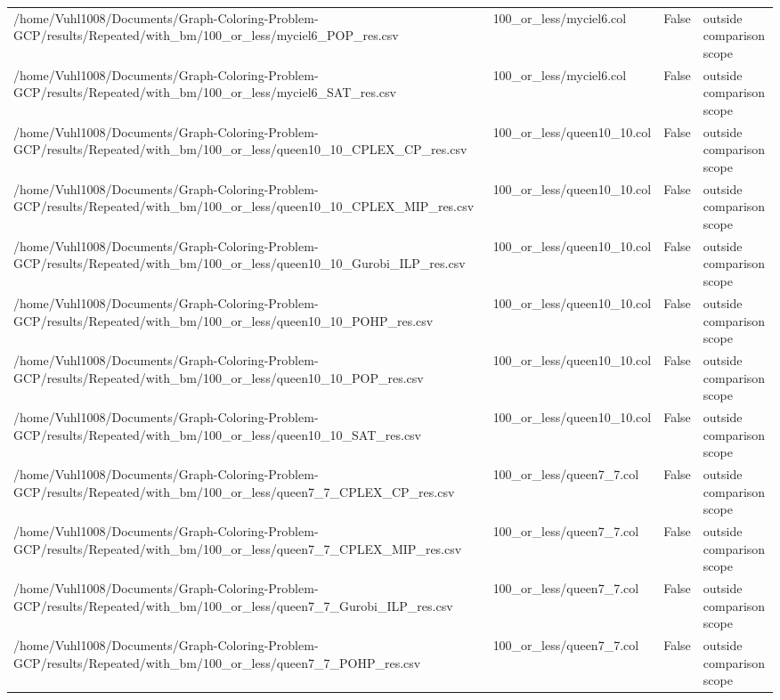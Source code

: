 \begin{table}[htbp]
\begin{tabular}{llll}
/home/Vuhl1008/Documents/Graph-Coloring-Problem-GCP/results/Repeated/with\_bm/100\_or\_less/myciel6\_POP\_res.csv & 100\_or\_less/myciel6.col & False & outside comparison scope \\
/home/Vuhl1008/Documents/Graph-Coloring-Problem-GCP/results/Repeated/with\_bm/100\_or\_less/myciel6\_SAT\_res.csv & 100\_or\_less/myciel6.col & False & outside comparison scope \\
/home/Vuhl1008/Documents/Graph-Coloring-Problem-GCP/results/Repeated/with\_bm/100\_or\_less/queen10\_10\_CPLEX\_CP\_res.csv & 100\_or\_less/queen10\_10.col & False & outside comparison scope \\
/home/Vuhl1008/Documents/Graph-Coloring-Problem-GCP/results/Repeated/with\_bm/100\_or\_less/queen10\_10\_CPLEX\_MIP\_res.csv & 100\_or\_less/queen10\_10.col & False & outside comparison scope \\
/home/Vuhl1008/Documents/Graph-Coloring-Problem-GCP/results/Repeated/with\_bm/100\_or\_less/queen10\_10\_Gurobi\_ILP\_res.csv & 100\_or\_less/queen10\_10.col & False & outside comparison scope \\
/home/Vuhl1008/Documents/Graph-Coloring-Problem-GCP/results/Repeated/with\_bm/100\_or\_less/queen10\_10\_POHP\_res.csv & 100\_or\_less/queen10\_10.col & False & outside comparison scope \\
/home/Vuhl1008/Documents/Graph-Coloring-Problem-GCP/results/Repeated/with\_bm/100\_or\_less/queen10\_10\_POP\_res.csv & 100\_or\_less/queen10\_10.col & False & outside comparison scope \\
/home/Vuhl1008/Documents/Graph-Coloring-Problem-GCP/results/Repeated/with\_bm/100\_or\_less/queen10\_10\_SAT\_res.csv & 100\_or\_less/queen10\_10.col & False & outside comparison scope \\
/home/Vuhl1008/Documents/Graph-Coloring-Problem-GCP/results/Repeated/with\_bm/100\_or\_less/queen7\_7\_CPLEX\_CP\_res.csv & 100\_or\_less/queen7\_7.col & False & outside comparison scope \\
/home/Vuhl1008/Documents/Graph-Coloring-Problem-GCP/results/Repeated/with\_bm/100\_or\_less/queen7\_7\_CPLEX\_MIP\_res.csv & 100\_or\_less/queen7\_7.col & False & outside comparison scope \\
/home/Vuhl1008/Documents/Graph-Coloring-Problem-GCP/results/Repeated/with\_bm/100\_or\_less/queen7\_7\_Gurobi\_ILP\_res.csv & 100\_or\_less/queen7\_7.col & False & outside comparison scope \\
/home/Vuhl1008/Documents/Graph-Coloring-Problem-GCP/results/Repeated/with\_bm/100\_or\_less/queen7\_7\_POHP\_res.csv & 100\_or\_less/queen7\_7.col & False & outside comparison scope \\

\end{tabular}
\end{table}
